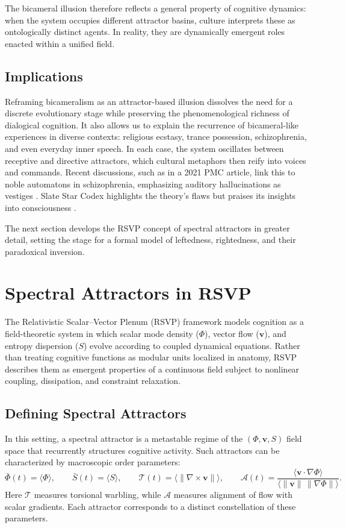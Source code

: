 \documentclass[a4paper,11pt]{article}
\begin{document}
The bicameral illusion therefore reflects a general property of cognitive dynamics: when the system occupies different attractor basins, culture interprets these as ontologically distinct agents. In reality, they are dynamically emergent roles enacted within a unified field.

\subsection{Implications}
Reframing bicameralism as an attractor-based illusion dissolves the need for a discrete evolutionary stage while preserving the phenomenological richness of dialogical cognition. It also allows us to explain the recurrence of bicameral-like experiences in diverse contexts: religious ecstasy, trance possession, schizophrenia, and even everyday inner speech. In each case, the system oscillates between receptive and directive attractors, which cultural metaphors then reify into voices and commands. Recent discussions, such as in a 2021 PMC article, link this to noble automatons in schizophrenia, emphasizing auditory hallucinations as vestiges \citep{pmcbicameral}. Slate Star Codex highlights the theory's flaws but praises its insights into consciousness \citep{slatestarcodexjaynes}.

The next section develops the RSVP concept of spectral attractors in greater detail, setting the stage for a formal model of leftedness, rightedness, and their paradoxical inversion.

\section{Spectral Attractors in RSVP}
\label{sec:spectral-attractors}

The Relativistic Scalar--Vector Plenum (RSVP) framework models cognition as a field-theoretic system in which scalar mode density ($\Phi$), vector flow ($\mathbf{v}$), and entropy dispersion ($S$) evolve according to coupled dynamical equations. Rather than treating cognitive functions as modular units localized in anatomy, RSVP describes them as emergent properties of a continuous field subject to nonlinear coupling, dissipation, and constraint relaxation.

\subsection{Defining Spectral Attractors}
In this setting, a spectral attractor is a metastable regime of the $(\Phi,\mathbf{v},S)$ field space that recurrently structures cognitive activity. Such attractors can be characterized by macroscopic order parameters:
\begin{equation}
\bar{\Phi}(t) = \langle \Phi \rangle, \qquad
\bar{S}(t) = \langle S \rangle, \qquad
\mathcal{T}(t) = \big\langle \|\nabla\times \mathbf{v}\|\big\rangle, \qquad
\mathcal{A}(t) = \frac{\langle \mathbf{v}\cdot \nabla \Phi\rangle}{\langle \|\mathbf{v}\|\,\|\nabla \Phi\|\rangle}.
\end{equation}
Here $\mathcal{T}$ measures torsional warbling, while $\mathcal{A}$ measures alignment of flow with scalar gradients. Each attractor corresponds to a distinct constellation of these parameters.
\end{document}
